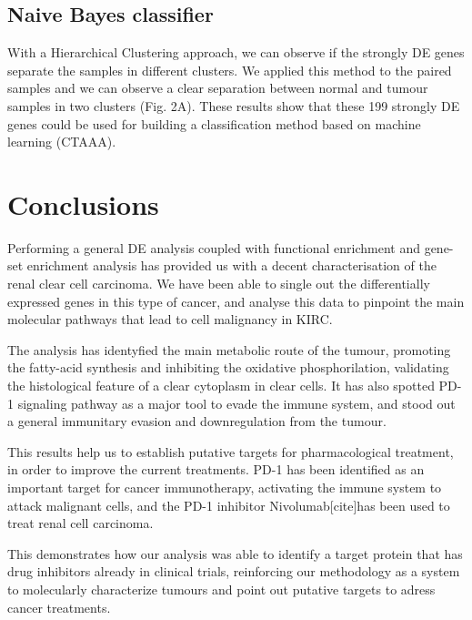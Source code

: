 \documentclass[9pt,twocolumn,twoside]{gsajnl}
\begin{document}
\subsection*{Naive Bayes classifier}
With a Hierarchical Clustering approach, we can observe if the strongly DE genes separate the samples in different clusters. We applied this method to the paired samples and we can observe a clear separation between normal and tumour samples in two clusters (Fig. 2A). These results show that these 199 strongly DE genes could be used for building a classification method based on machine learning (CTAAA). 

\section*{Conclusions}

Performing a general DE analysis coupled with functional enrichment and gene-set enrichment analysis has provided us with a decent characterisation of the renal clear cell carcinoma. We have been able to single out the differentially expressed genes in this type of cancer, and analyse this data to pinpoint the main molecular pathways that lead to cell malignancy in KIRC. 

The analysis has identyfied the main metabolic route of the tumour, promoting the fatty-acid synthesis and inhibiting the oxidative phosphorilation, validating the histological feature of a clear cytoplasm in clear cells. It has also spotted PD-1 signaling pathway as a major tool to evade the immune system, and
stood out a general immunitary evasion and downregulation from the tumour.

This results help us to establish putative targets for pharmacological treatment, in order to improve the current treatments. PD-1 has been identified as an important target for cancer immunotherapy, activating the immune system to attack malignant cells, and the PD-1 inhibitor Nivolumab[cite]has been used to treat renal cell carcinoma.


This demonstrates how our analysis was able to identify a target protein that has drug inhibitors already in clinical trials, reinforcing our  methodology as a system to molecularly characterize tumours and point out putative targets to adress cancer treatments.
\end{document}
